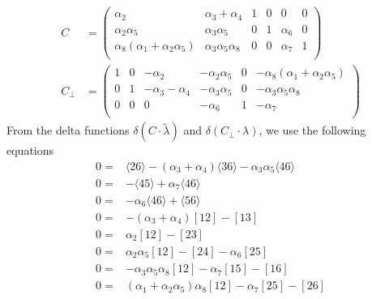 \documentclass[letter,11pt]{article}
\begin{document}
\begin{equation}
	\begin{aligned}
		C&=\left(
		\begin{array}{cccccc}
			\alpha_2 & \alpha_3 + \alpha_4 & 1 & 0 & 0 & 0 \\
		\alpha_2 \alpha_5 & \alpha_3 \alpha_5 & 0 & 1 & \alpha_6 & 0 \\
		\alpha_8 (\alpha_1+\alpha_2 \alpha_5) & \alpha_3 \alpha_5
		\alpha_8 & 0 & 0 & \alpha_7 & 1 \\
		\end{array}
		\right)\\
		C_\perp&=
		\left(
		\begin{array}{cccccc}
			1 & 0 & -\alpha_2 & -\alpha_2 \alpha_5 & 0 & -\alpha_8 (\alpha
				_1+\alpha_2 \alpha_5) \\
			0 & 1 & -\alpha_3-\alpha_4 & -\alpha_3 \alpha_5 & 0 & -\alpha_3
			\alpha_5 \alpha_8 \\
			0 & 0 & 0 & -\alpha_6 & 1 & -\alpha_7 \\
		\end{array}
		\right)
	\end{aligned}
\end{equation}
From the delta functions $\delta(C\cdot \tilde \lambda)$ and $\delta(C_\perp \cdot \lambda)$, we use the following equations
\begin{equation}
	\begin{aligned}
		0=&\langle 2 6 \rangle - (\alpha_{3} + \alpha_{4}) \langle 3 6 \rangle - \alpha_{3} \alpha_{5} \langle 4 6 \rangle
		\\
		0=&-\langle 4 5 \rangle + \alpha_{7} \langle 4 6 \rangle
		\\
	0=&	-\alpha_{6} \langle 4 6 \rangle + \langle 5 6 \rangle
		\\
	0=&	-(\alpha_{3} + \alpha_{4}) \left[ 1 2 \right] - \left[ 1 3 \right]
		\\
	0=&	\alpha_{2} \left[ 1 2 \right] - \left[ 2 3 \right]
		\\
	0=&	\alpha_{2} \alpha_{5} \left[ 1 2 \right] - \left[ 2 4 \right] - \alpha_{6} \left[ 2 5 \right]
		\\
	0=&	-\alpha_{3} \alpha_{5} \alpha_{8} \left[ 1 2 \right] - \alpha_{7} \left[ 1 5 \right] - \left[ 1 6 \right]
		\\
	0=&	(\alpha_{1} + \alpha_{2} \alpha_{5}) \alpha_{8} \left[ 1 2 \right] - \alpha_{7} \left[ 2 5 \right] - \left[ 2 6 \right]
	\end{aligned}
\end{equation}
\end{document}
